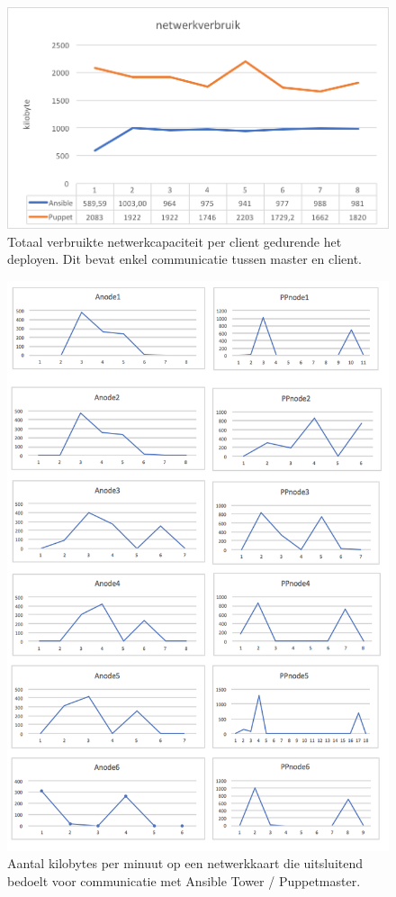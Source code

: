 \begin{figure}
  \includegraphics[width=\linewidth]{img/netwerkverbruik.png}
 \caption{Totaal verbruikte netwerkcapaciteit per client gedurende het deployen. Dit bevat enkel communicatie tussen master en client.}  
  \label{fig:netwerkverbruik}
\end{figure}


\begin{figure}
  \includegraphics[width=\linewidth]{img/netwerkverbruikpernode.png}
 \caption{Aantal kilobytes per minuut op een netwerkkaart die uitsluitend bedoelt voor communicatie met Ansible Tower / Puppetmaster. }  
  \label{fig:netwerkverbruikpernode}
\end{figure}

